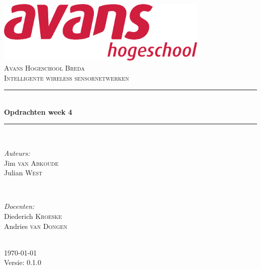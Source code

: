 \documentclass[12pt]{article}
\begin{document}
\newcommand{\weeknumber}{4}

\begin{titlepage}
\newcommand{\HRule}{\rule{\linewidth}{0.5mm}} %

\center %

\includegraphics[height=3cm]{avans}\\%
\textsc{\Large Avans Hogeschool Breda}\\[0.5cm] %
\textsc{\large Intelligente wireless sensornetwerken}\\[0.5cm] %
\HRule \\[0.4cm]
{ \huge \bfseries Opdrachten week \weeknumber}\\[0.4cm] %
\HRule \\[1.5cm]

\begin{minipage}{0.4\textwidth}
\begin{flushleft} \large
\emph{Auteurs:}\\
Jim \textsc{van Abkoude} \\
Julian \textsc{West} \\
\end{flushleft}
\end{minipage}
~
\begin{minipage}{0.4\textwidth}
\begin{flushright} \large
\emph{Docenten:} \\
Diederich \textsc{Kroeske} \\ %
Andries \textsc{van Dongen} \\ %
\end{flushright}
\end{minipage}\\[4cm]

{\large \today}\\[3cm] %

Versie: 0.1.0

\vfill %

\end{titlepage}
\end{document}
